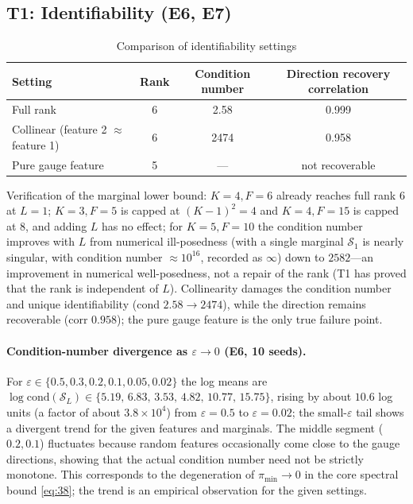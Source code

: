 \documentclass[11pt,a4paper]{article}
\theoremstyle{remark}
\begin{document}
\subsection{T1: Identifiability (E6, E7)}

\begin{table}[tbhp]
\centering
\begin{tabular}{lccc}
\toprule
Setting & Rank & Condition number & Direction recovery correlation \\
\midrule
Full rank & 6 & 2.58 & 0.999 \\
Collinear (feature 2 $\approx$ feature 1) & 6 & 2474 & 0.958 \\
Pure gauge feature & 5 & --- & not recoverable \\
\bottomrule
\end{tabular}
\caption{Comparison of identifiability settings}
\label{tab:identifiability}
\end{table}

Verification of the marginal lower bound: $K{=}4,F{=}6$ already reaches full rank $6$ at
$L=1$; $K{=}3,F{=}5$ is capped at $(K-1)^2=4$ and $K{=}4,F{=}15$ is capped at $8$, and
adding $L$ has no effect; for $K{=}5,F{=}10$ the condition number improves with $L$ from
numerical ill-posedness (with a single marginal $\mathcal{S}_1$ is nearly singular, with
condition number $\approx10^{16}$, recorded as $\infty$) down to $2582$---an improvement in
numerical well-posedness, not a repair of the rank (T1 has proved that the rank is
independent of $L$). Collinearity damages the condition number and unique identifiability
(cond $2.58\to2474$), while the direction remains recoverable (corr $0.958$); the pure
gauge feature is the only true failure point.

\paragraph{Condition-number divergence as $\varepsilon\to0$ (E6, 10 seeds).}
For $\varepsilon\in\{0.5,0.3,0.2,0.1,0.05,0.02\}$ the log means are
$\log\mathrm{cond}(\mathcal{S}_L)\in\{5.19,\,6.83,\,3.53,\,4.82,\,10.77,\,15.75\}$, rising
by about $10.6$ log units (a factor of about $3.8\times10^4$) from $\varepsilon=0.5$ to
$\varepsilon=0.02$; the small-$\varepsilon$ tail shows a divergent trend for the given
features and marginals. The middle
segment ($0.2,0.1$) fluctuates because random features occasionally come close to the gauge
directions, showing that the actual condition number need not be strictly monotone. This
corresponds to the degeneration of $\pi_{\min}\to0$ in the core spectral bound
\eqref{eq:38}; the trend is an empirical observation for the given settings.
\end{document}
